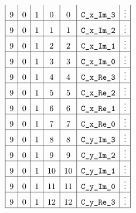 \begin{figure}[h!]
\begin{adjustwidth}{-2cm}{-2cm}
{\[\begin{array}{|c|c|c|c|c|c|c|}
                9 & 0      & 1      & 0         & 0         & \texttt{C\_x\_Im\_3}             & \vdots                                                                     \\ \hline
                9 & 0      & 1      & 1         & 1         & \texttt{C\_x\_Im\_2}               & \vdots                                                                     \\ \hline
                9 & 0      & 1      & 2         & 2         & \texttt{C\_x\_Im\_1}               & \vdots                                                                     \\ \hline
                9 & 0      & 1      & 3         & 3         & \texttt{C\_x\_Im\_0}              & \vdots                                                                     \\ \hline
                9 & 0      & 1      & 4         & 4         & \texttt{C\_x\_Re\_3}             & \vdots                                                                     \\ \hline
                9 & 0      & 1      & 5         & 5         & \texttt{C\_x\_Re\_2}               & \vdots                                                                     \\ \hline
                9 & 0      & 1      & 6         & 6         & \texttt{C\_x\_Re\_1}               & \vdots                                                                     \\ \hline
                9 & 0      & 1      & 7         & 7         & \texttt{C\_x\_Re\_0}              & \vdots                                                                     \\ \hline
                9 & 0      & 1      & 8         & 8         & \texttt{C\_y\_Im\_3}             & \vdots                                                                     \\ \hline
                9 & 0      & 1      & 9         & 9         & \texttt{C\_y\_Im\_2}               & \vdots                                                                     \\ \hline
                9 & 0      & 1      & 10        & 10        & \texttt{C\_y\_Im\_1}               & \vdots                                                                     \\ \hline
                9 & 0      & 1      & 11        & 11        & \texttt{C\_y\_Im\_0}              & \vdots                                                                     \\ \hline
                9 & 0      & 1      & 12        & 12        & \texttt{C\_y\_Re\_3}             & \vdots                                                                     \\ \hline

\end{array}\]}
\end{adjustwidth}
\end{figure}
